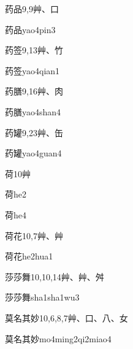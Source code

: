 \begin{entry}{药品}{9,9}{⾋、⼝}
  \begin{phonetics}{药品}{yao4pin3}
  \end{phonetics}
\end{entry}

\begin{entry}{药签}{9,13}{⾋、⽵}
  \begin{phonetics}{药签}{yao4qian1}
  \end{phonetics}
\end{entry}

\begin{entry}{药膳}{9,16}{⾋、⾁}
  \begin{phonetics}{药膳}{yao4shan4}
  \end{phonetics}
\end{entry}

\begin{entry}{药罐}{9,23}{⾋、⽸}
  \begin{phonetics}{药罐}{yao4guan4}
  \end{phonetics}
\end{entry}

\begin{entry}{荷}{10}{⾋}
  \begin{phonetics}{荷}{he2}
  \end{phonetics}
  \begin{phonetics}{荷}{he4}
  \end{phonetics}
\end{entry}

\begin{entry}{荷花}{10,7}{⾋、⾋}
  \begin{phonetics}{荷花}{he2hua1}
  \end{phonetics}
\end{entry}

\begin{entry}{莎莎舞}{10,10,14}{⾋、⾋、⾇}
  \begin{phonetics}{莎莎舞}{sha1sha1wu3}
  \end{phonetics}
\end{entry}

\begin{entry}{莫名其妙}{10,6,8,7}{⾋、⼝、⼋、⼥}
  \begin{phonetics}{莫名其妙}{mo4ming2qi2miao4}
  \end{phonetics}
\end{entry}

